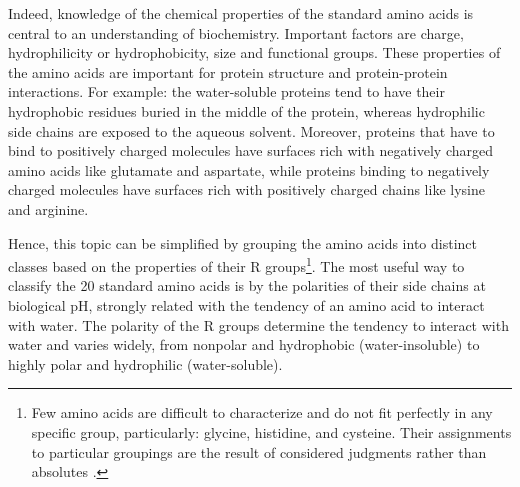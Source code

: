 Indeed, knowledge of the chemical properties of the standard amino acids is central to an understanding of biochemistry. Important factors are charge, hydrophilicity or hydrophobicity, size and functional groups. These properties of the amino acids are important for protein structure and protein-protein interactions. For example: the water-soluble proteins tend to have their hydrophobic residues buried in the middle of the protein, whereas hydrophilic side chains are exposed to the aqueous solvent. Moreover, proteins that have to bind to positively charged molecules have surfaces rich with negatively charged amino acids like glutamate and aspartate, while proteins binding to negatively charged molecules have surfaces rich with positively charged chains like lysine and arginine.

Hence, this topic can be simplified by grouping the amino acids into distinct classes based on the properties of their R groups\footnote{Few amino acids are difficult to characterize and do not fit perfectly in any specific group, particularly: glycine, histidine, and cysteine. Their assignments to particular groupings are the result of considered judgments rather than absolutes
\cite{nelson2008lehninger}.}. The most useful way to classify the 20 standard amino acids is by the polarities of their side chains at biological pH, strongly related with the tendency of an amino acid to interact with water. The polarity of the R groups determine the tendency to interact with water and varies widely, from nonpolar and hydrophobic (water-insoluble) to highly polar and hydrophilic (water-soluble).

